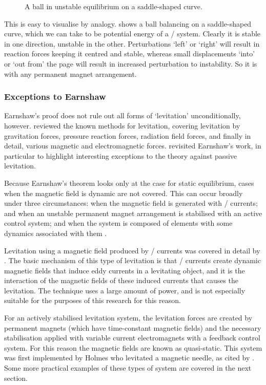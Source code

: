 \begin{figure}
  \caption{A ball in unstable equilibrium on a saddle-shaped curve.}
\end{figure}

This is easy to visualise by analogy.
 shows a ball balancing on a saddle-shaped curve, which we can take to be potential energy of a \twoD/ system.
Clearly it is stable in one direction, unstable in the other.
Perturbations `left' or `right' will result in reaction forces keeping it centred and stable, whereas small displacements `into' or `out from' the page will result in increased perturbation to instability.
So it is with any permanent magnet arrangement.


\subsubsection{Exceptions to Earnshaw}

Earnshaw's proof does not rule out all forms of `levitation' unconditionally, however.
\textcite{boerdijk1956a} reviewed the known methods for levitation, covering levitation by gravitation forces, pressure reaction forces, radiation field forces, and finally in detail, various magnetic and electromagnetic forces.
\textcite{bassani2006} revisited Earnshaw's work, in particular to highlight interesting exceptions to the theory against passive levitation.

Because Earnshaw's theorem looks only at the case for static equilibrium, cases when the magnetic field is dynamic are not covered.
This can occur broadly under three circumstances: when the magnetic field is generated with \AC/ currents; and when an unstable permanent magnet arrangement is stabilised with an active control system; and when the system is composed of elements with some dynamics associated with them 
.

Levitation using a magnetic field produced by \AC/ currents was covered in detail by \textcite{laithwaite1965}.
The basic mechanism of this type of levitation is that \AC/ currents create dynamic magnetic fields that induce eddy currents in a levitating object, and it is the interaction of the magnetic fields of these induced currents that causes the levitation.
The technique uses a large amount of power, and is not especially suitable for the purposes of this research for this reason.

For an actively stabilised levitation system, the levitation forces are created by permanent magnets (which have time-constant magnetic fields) and the necessary stabilisation applied with variable current electromagnets with a feedback control system.
For this reason the magnetic fields are known as quasi-static.
This system was first implemented by Holmes who levitated a magnetic needle, as cited by \textcite{boerdijk1956a}.
Some more practical examples of these types of system are covered in the next section.

